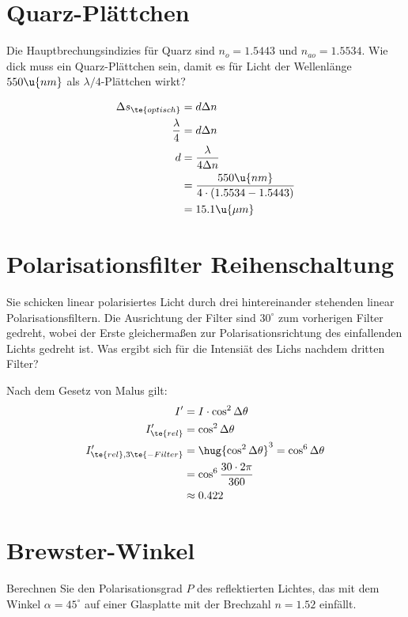 \documentclass[ex]{exercise}
\begin{document}
\section{Quarz-Plättchen}
Die Hauptbrechungsindizies für Quarz sind \(n_{o}=1.5443\) und \(n_{ao}=1.5534\). Wie dick muss ein 
Quarz-Plättchen sein, damit es für Licht der Wellenlänge \(550 \u{nm}\) als \(\lambda/4\)-Plättchen wirkt?

\dottedlinete

\begin{align*}
    \Delta s_{\te{optisch}} &= d \Delta n\\
    \frac{\lambda}{4} &= d \Delta n\\
    d &= \frac{\lambda}{4\Delta n}\\
    &= \frac{550\u{nm}}{4\cdot (1.5534 - 1.5443)}\\
    &= 15.1 \u{\mu m}
\end{align*}

\section{Polarisationsfilter Reihenschaltung}
Sie schicken linear polarisiertes Licht durch drei hintereinander stehenden linear Polarisationsfiltern.
Die Ausrichtung der Filter sind \(30^\circ\) zum vorherigen Filter gedreht, wobei der Erste 
gleicherma{\ss}en zur Polarisationsrichtung des einfallenden Lichts gedreht ist. Was 
ergibt sich für die Intensiät des Lichs nachdem dritten Filter?

\dottedlinett

Nach dem Gesetz von Malus gilt:
\begin{align*} 
    I' &= I \cdot \cos^2\Delta\theta\\
    I'_{\te{rel}} &= \cos^2\Delta\theta\\
    I'_{\te{rel},3\te{-Filter}} &= \hug{\cos^2\Delta\theta}^3=\cos^6\Delta\theta\\
    &= \cos^6 \frac{30\cdot 2\pi}{360}\\
    &\approx 0.422 
\end{align*}

\section{Brewster-Winkel}
Berechnen Sie den Polarisationsgrad \(P\) des reflektierten Lichtes, das mit dem Winkel
\(\alpha=45^\circ\) auf einer Glasplatte mit der Brechzahl \(n=1.52\) einfällt.
\end{document}
